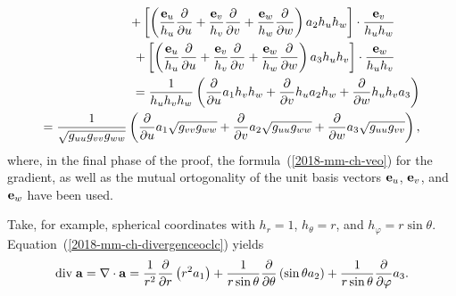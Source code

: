 \begin{equation}
\begin{split}
+ \left[\left(
\frac{{\bf e}_u}{h_u}  \frac{\partial   }{\partial u}    +
\frac{{\bf e}_v}{h_v}  \frac{\partial   }{\partial v}      +
\frac{{\bf e}_w}{h_w} \frac{\partial   }{\partial w}
\right) a_2 h_u h_w\right] \cdot    \frac{ {\bf e}_v}{h_u h_w} \qquad \\
+ \left[\left(
\frac{{\bf e}_u}{h_u}  \frac{\partial   }{\partial u}    +
\frac{{\bf e}_v}{h_v}  \frac{\partial   }{\partial v}      +
\frac{{\bf e}_w}{h_w} \frac{\partial   }{\partial w}
\right) a_3 h_u h_v\right] \cdot    \frac{ {\bf e}_w}{h_u h_v} \qquad \\
= \frac{ 1 }{h_u h_v h_w}
\left(
\frac{\partial   }{\partial u} a_1 h_v h_w+
\frac{\partial   }{\partial v} h_u a_2 h_w+
\frac{\partial   }{\partial w} h_u h_v a_3
\right) \\
= \frac{ 1 }{\sqrt{g_{uu} g_{vv} g_{ww}}}
\left(
\frac{\partial   }{\partial u} a_1 \sqrt{g_{vv} g_{ww}}+
\frac{\partial   }{\partial v} a_2 \sqrt{g_{uu} g_{ww}}+
\frac{\partial   }{\partial w} a_3 \sqrt{g_{uu} g_{vv}}
\right),
\end{split}
\label{2018-mm-ch-divergenceoclc}
\end{equation}
where, in the final phase of the proof, the formula~(\ref{2018-mm-ch-veo}) for the gradient,
as well as the mutual ortogonality of the unit basis vectors
${\bf e}_u$,
${\bf e}_v$, and
${\bf e}_w$
have been used.



{
\color{blue}
\bexample
Take, for example, spherical coordinates with
$
h_r=1$,
$
h_\theta=r$, and
$
h_\varphi=r\sin \theta$.
Equation~(\ref{2018-mm-ch-divergenceoclc}) yields
\begin{equation}
\text{div}\;{\bf a} = \nabla \cdot {\bf a} =
\frac{1}{r^2}
\frac{\partial}{\partial r}
\left( r^2 a_1\right)
+
\frac{1}{r \sin \theta}
\frac{\partial}{\partial \theta}
\left( \sin \theta a_2\right)
+
\frac{1}{r \sin \theta}
\frac{\partial}{\partial \varphi}
 a_3
.
\end{equation}
\eexample
}





